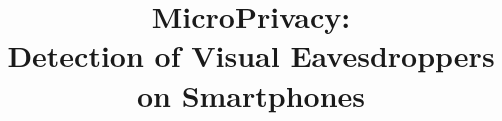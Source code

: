 \documentclass[10pt, conference, letterpaper]{IEEEtran}
\begin{document}
\title{MicroPrivacy: \\Detection of Visual Eavesdroppers on Smartphones}



%

\author{}


\maketitle


\end{document}
